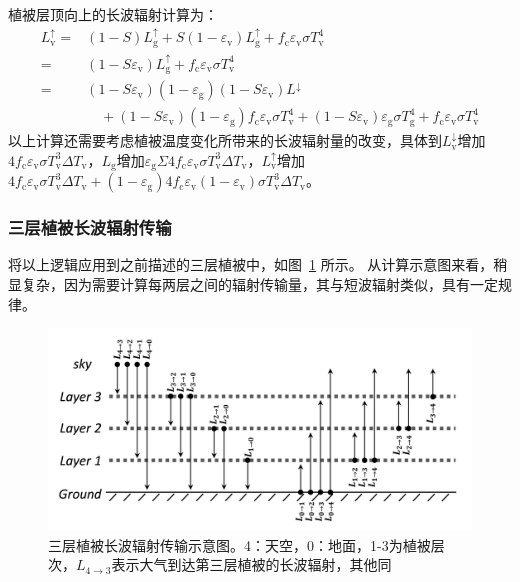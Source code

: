 植被层顶向上的长波辐射计算为：
\begin{equation}
  \begin{aligned} L_{\mathrm {v}} ^\uparrow=&(1-S) L_{\mathrm{g}} ^\uparrow+S\left(1-\varepsilon_{\mathrm{v}}\right) L_{\mathrm{g}}
    ^\uparrow+f_{\mathrm{c}} \varepsilon_{\mathrm{v}} \sigma T_{\mathrm{v}}^{4} \\=&\left(1-S \varepsilon_{\mathrm{v}}\right) L_{\mathrm{g}}
    ^\uparrow+f_{\mathrm{c}} \varepsilon_{\mathrm{v}} \sigma T_{\mathrm{v}}^{4} \\=&\left(1-S \varepsilon_{\mathrm{v}}\right)\left(1-\varepsilon_{\mathrm{g}}\right)\left(1-S \varepsilon_{\mathrm{v}}\right) L^\downarrow \\
    & \quad +\left(1-S \varepsilon_{\mathrm{v}}\right)\left(1-\varepsilon_{\mathrm{g}}\right) f_{\mathrm{c}} \varepsilon_{\mathrm{v}} \sigma T_{\mathrm{v}}^{4}+\left(1-S \varepsilon_{\mathrm{v}}\right)
  \varepsilon_{\mathrm{g}} \sigma T_{\mathrm{g}}^{4}+f_{\mathrm{c}} \varepsilon_{\mathrm{v}} \sigma T_{\mathrm{v}}^{4} \end{aligned}
\end{equation}
以上计算还需要考虑植被温度变化所带来的长波辐射量的改变，具体到$L_{\mathrm {v}}^\downarrow$增加$4f_{\mathrm {c}}\varepsilon_{\mathrm {v}}\sigma T_{\mathrm {v}}^3\Delta T_{\mathrm {v}}$，${L_{\mathrm{g}}}$增加$\varepsilon_{\mathrm{g}} \Sigma 4 f_{\mathrm{c}} \varepsilon_{\mathrm{v}} \sigma T_{\mathrm{v}}^{3} \Delta T_{\mathrm{v}}$，$L_{\mathrm {v}} ^\uparrow$增加$4 f_{\mathrm{c}} \varepsilon_{\mathrm{v}} \sigma T_{\mathrm{v}}^{3} \Delta T_{\mathrm{v}}+(1-\varepsilon_{\mathrm{g}}) 4 f_{\mathrm{c}}
\varepsilon_{\mathrm{v}}(1-\varepsilon_{\mathrm{v}}) \sigma T_{\mathrm{v}}^{3} \Delta T_{\mathrm{v}}$。

\subsubsection{三层植被长波辐射传输}

将以上逻辑应用到之前描述的三层植被中，如图~\ref{fig:三层植被长波辐射传输示意图} 所示。
从计算示意图来看，稍显复杂，因为需要计算每两层之间的辐射传输量，其与短波辐射类似，具有一定规律。
%
{
  \begin{figure}[htbp]
    \centering
    \includegraphics[width=0.8\columnwidth]{Figures/辐射过程及辐射通量计算/三层植被长波辐射传输示意图.png}
    \caption[三层植被长波辐射传输示意图]{三层植被长波辐射传输示意图。4：天空，0：地面，1-3为植被层次，$L_{4 \rightarrow 3}$表示大气到达第三层植被的长波辐射，其他同}
    \label{fig:三层植被长波辐射传输示意图}
  \end{figure}
}
%

